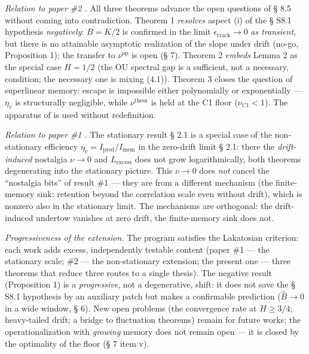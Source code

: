 \documentclass[12pt]{iopart}
\begin{document}
\emph{Relation to paper \#2 \cite{Andriishin2026b}.} All three theorems advance the open questions of § 8.5 without coming into contradiction. Theorem 1 \emph{resolves} aspect (i) of the § S8.1 hypothesis \emph{negatively}: \(B = K/2\) is confirmed in the limit \(\epsilon_{\text{track}}\to 0\) \emph{as transient}, but there is no attainable asymptotic realization of the slope under drift (no-go, Proposition 1); the transfer to \(\nu^{\text{op}}\) is open (§ 7). Theorem 2 \emph{embeds} Lemma 2 as the special case \(H = 1/2\) (the OU spectral gap is a sufficient, not a necessary, condition; the necessary one is mixing (4.1)). Theorem 3 closes the question of superlinear memory: escape is impossible either polynomially or exponentially --- \(\eta_v\) is structurally negligible, while \(\nu^{\text{theor}}\) is held at the C1 floor (\(\nu_{C1} < 1\)). The apparatus of \cite{Andriishin2026b} is used without redefinition.



\emph{Relation to paper \#1 \cite{Andriishin2026a}.} The stationary result \cite{Andriishin2026a} § 2.1 is a special case of the non-stationary efficiency \(\eta_v = I_{\text{pred}}/I_{\text{mem}}\) in the zero-drift limit \cite{Andriishin2026b} § 2.1: there the \emph{drift-induced} nostalgia \(\nu \to 0\) and \(L_{\text{excess}}\) does not grow logarithmically, both theorems degenerating into the stationary picture. This \(\nu \to 0\) does \emph{not} cancel the ``nostalgia bits'' of result \#1 --- they are from a different mechanism (the finite-memory sink: retention beyond the correlation scale even without drift), which is nonzero also in the stationary limit. The mechanisms are orthogonal: the drift-induced undertow vanishes at zero drift, the finite-memory sink does not.



\emph{Progressiveness of the extension.} The program satisfies the Lakatosian criterion: each work adds excess, independently testable content (paper \#1 --- the stationary scale; \#2 --- the non-stationary extension; the present one --- three theorems that reduce three routes to a single thesis). The negative result (Proposition 1) is a \emph{progressive}, not a degenerative, shift: it does not save the § S8.1 hypothesis by an auxiliary patch but makes a confirmable prediction (\(\hat B \to 0\) in a wide window, § 6). New open problems (the convergence rate at \(H \ge 3/4\); heavy-tailed drift; a bridge to fluctuation theorems) remain for future works; the operationalization with \emph{growing} memory does not remain open --- it is closed by the optimality of the floor (§ 7 item v).
\end{document}
